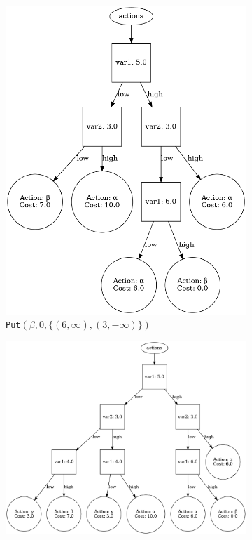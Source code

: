 \documentclass{article}
\begin{document}
\begin{figure}[H]
\begin{subfigure}[t]{0.35\textwidth}
        \includegraphics[width=.9\textwidth]{exampleBuild3}
        \captionsetup{labelformat=empty}
        \caption{%
            \texttt{Put}$(\beta, 0, \{(6, \infty),(3,-\infty)\})$
        }
        \vspace{2ex}
    \end{subfigure}
    \begin{subfigure}[t]{0.55\textwidth}
        \centering
        \includegraphics[width=.9\textwidth]{exampleBuild5}

\end{subfigure}
\end{figure}
\end{document}
